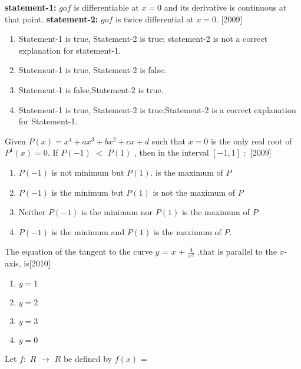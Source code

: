 \documentclass[journal,12pt,twocolumn]{IEEEtran}
\theoremstyle{remark}
\begin{document}
    \textbf{statement-1:}  $gof$ is differentiable at $x=0$ and its derivative is continuous at that point.
            \textbf{statement-2:  }$gof$ is twice differential at $x = 0$. 
                 \hfill[2009] 
        
    
        \begin{enumerate}
        
            
        
            \item Statement-1 is true, Statement-2 is true; statement-2 is not a correct explanation for statement-1.
            
        \item Statement-1 is true, Statement-2 is false.
        \item Statement-1 is false,Statement-2 is true.
        \item Statement-1 is true, Statement-2 is true;Statement-2 is a correct explanation for Statement-1.

        \end{enumerate}
        \item Given $ P(x)=x^4+ ax^3+bx^2+ cx+d$ such that $x = 0$ is the only real root of $P^1(x) = 0$. If $P(-1)$ $<$ $P(1)$ , then in the interval $[-1,1]$ $\colon$ \hfill[2009]
        \begin{enumerate}
        
            
        
            
        \item $P(-1)$ is not minimum but $P(1)$. is the maximum of $P$
        \item $P(-1)$ is the minimum but $P(1)$ is not the maximum of $P$
        \item  Neither $P(-1)$ is the  minimum nor  $P(1)$ is the maximum of $P$
        \item $P(-1)$ is the minimum and $P(1)$ is the maximum of $P$.
        
        \end{enumerate}
        \item The equation of the tangent to the curve $y$ = $x$ + $\frac{4}{x^2}$ ,that is parallel to the $x$-axis, is\hfill[2010]
        \begin{enumerate}
        
            
        
            \item $y=1$
        \item $y=2$
        \item $y=3$
        \item $y=0$
        \end{enumerate}
        \item Let $f$$\colon$ $R$ $\to$ $R$ be defined by $f(x)$ = 
    
\end{document}
